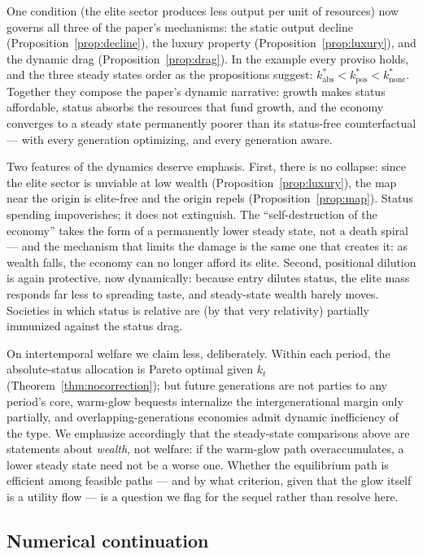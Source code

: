 \documentclass[12pt,letterpaper]{article}
\theoremstyle{definition}
\begin{document}
One condition (the elite sector produces less output per unit of resources) now governs all three of the paper's mechanisms: the static output decline (Proposition~\ref{prop:decline}), the luxury property (Proposition~\ref{prop:luxury}), and the dynamic drag (Proposition~\ref{prop:drag}).
In the example every proviso holds, and the three steady states order as the propositions suggest: $k^\ast_{\mathrm{abs}} < k^\ast_{\mathrm{pos}} < k^\ast_{\mathrm{none}}$.
Together they compose the paper's dynamic narrative: growth makes status affordable, status absorbs the resources that fund growth, and the economy converges to a steady state permanently poorer than its status-free counterfactual --- with every generation optimizing, and every generation aware.

Two features of the dynamics deserve emphasis.
First, there is no collapse: since the elite sector is unviable at low wealth (Proposition~\ref{prop:luxury}), the map near the origin is elite-free and the origin repels (Proposition~\ref{prop:map}).
Status spending impoverishes; it does not extinguish.
The ``self-destruction of the economy'' takes the form of a permanently lower steady state, not a death spiral --- and the mechanism that limits the damage is the same one that creates it: as wealth falls, the economy can no longer afford its elite.
Second, positional dilution is again protective, now dynamically: because entry dilutes status, the elite mass responds far less to spreading taste, and steady-state wealth barely moves.
Societies in which status is relative are (by that very relativity) partially immunized against the status drag.

On intertemporal welfare we claim less, deliberately.
Within each period, the absolute-status allocation is Pareto optimal given $k_t$ (Theorem~\ref{thm:nocorrection}); but future generations are not parties to any period's core, warm-glow bequests \citep{andreoni1990} internalize the intergenerational margin only partially, and overlapping-generations economies admit dynamic inefficiency of the \citet{diamond1965} type.
We emphasize accordingly that the steady-state comparisons above are statements about \emph{wealth}, not welfare: if the warm-glow path overaccumulates, a lower steady state need not be a worse one.
Whether the equilibrium path is efficient among feasible paths --- and by what criterion, given that the glow itself is a utility flow --- is a question we flag for the sequel rather than resolve here.

\subsection{Numerical continuation}
\end{document}
